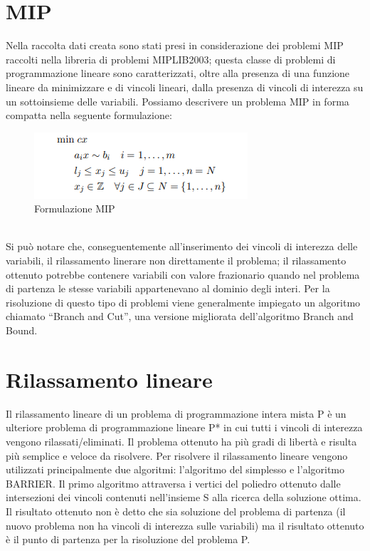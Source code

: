 \documentclass[12pt,a4paper,twoside,openright]{book}
\begin{document}
\section{MIP}
Nella raccolta dati creata sono stati presi in considerazione dei problemi
MIP raccolti nella libreria di problemi MIPLIB2003; questa classe di problemi
di programmazione lineare sono caratterizzati, oltre alla presenza di una funzione
lineare da minimizzare e di vincoli lineari, dalla presenza di vincoli di interezza
su un sottoinsieme delle variabili. Possiamo descrivere un problema MIP in forma compatta
nella seguente formulazione: \pagebreak
\begin{figure}[ht]
    \centering
    \includegraphics [scale = 0.7]{mip_scheme.png}
    \caption{ Formulazione MIP }
    \label{fig:mip}
\end{figure}
\\
Si può notare che, conseguentemente all’inserimento dei vincoli di interezza delle variabili,
il rilassamento linerare non direttamente il problema; il rilassamento ottenuto potrebbe contenere variabili con valore frazionario
quando nel problema di partenza le stesse variabili appartenevano al dominio degli interi.
Per la risoluzione di questo tipo di problemi viene generalmente impiegato un algoritmo 
chiamato “Branch and Cut”, una versione migliorata dell’algoritmo Branch and Bound.

\section{Rilassamento lineare}
Il rilassamento lineare di un problema di programmazione intera mista P è un ulteriore problema di programmazione lineare P* in cui
tutti i vincoli di interezza vengono rilassati/eliminati. Il problema ottenuto ha più gradi di libertà
e risulta più semplice e veloce da risolvere. Per risolvere il rilassamento lineare vengono utilizzati principalmente
due algoritmi: l'algoritmo del simplesso e l'algoritmo BARRIER. Il primo algoritmo attraversa i vertici del poliedro ottenuto dalle intersezioni 
dei vincoli contenuti nell'insieme S alla ricerca della soluzione ottima. Il risultato ottenuto non 
è detto che sia soluzione del problema di partenza (il nuovo problema non ha vincoli di interezza sulle 
variabili) ma il risultato ottenuto è il punto di partenza per la risoluzione del problema P. 
    
\end{document}
